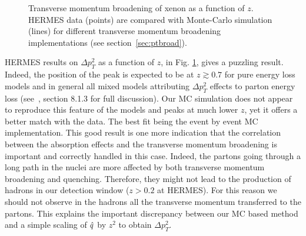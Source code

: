 \begin{figure}[tbp]
  \centering
{}
\caption {Transverse momentum broadening of xenon as a function of $z$. HERMES 
data \cite{Airapetian:2009jy} (points) are compared with Monte-Carlo simulation 
(lines) for different transverse momentum broadening implementations (see 
section~\ref{sec:ptbroad}).}
\label{fig:PtC-Ptz}
\end{figure}

HERMES results on $\Delta p_T^2$ as a function of $z$, in Fig. \ref{fig:PtC-Ptz}, gives a puzzling result. Indeed, the position of the peak is expected to be at $z\gtrsim 0.7$ for pure energy loss models and in general all mixed models attributing $\Delta p_T^2$ effects to parton energy loss (see~\cite{Accardi:2009qv}, section 8.1.3 for full discussion). Our MC simulation does not appear to reproduce this feature of the models and peaks at much lower $z$, yet it offers a better match with the data. The best fit being the event by event MC implementation. This good result is one more indication that the correlation between the absorption effects and the transverse momentum broadening is important and correctly handled in this case. Indeed, the partons going through a long path in the nuclei are more affected by both transverse momentum broadening and quenching. Therefore, they might not lead to the production of hadrons in our detection window ($z>0.2$ at HERMES). For this reason we should not observe in the hadrons all the transverse momentum transferred to the partons. This explains the important discrepancy between our MC based method and a simple scaling of ${\hat q}$ by $z^2$ to obtain $\Delta p_T^2$.


